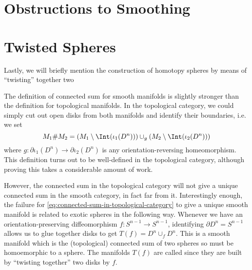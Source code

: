 
\section{Obstructions to Smoothing}\label{sec:smoothing-obstructions}

\begin{theorem}[Freedman, 1982]\label{thm:freedman-actual}
\end{theorem}

\section{Twisted Spheres}\label{sec:twisted-spheres}
Lastly, we will briefly mention the construction of homotopy spheres by means of ``twisting'' together two 


	The definition of connected sum for smooth manifolds is slightly stronger than the definition for topological manifolds. In the topological category, we could simply cut out open disks from both manifolds and identify their boundaries, i.e. we set
	\begin{equation}\label{eq:connected-sum-in-topological-category}
		M_1\# M_2 = (M_1\setminus \Int(\iota_1(D^n)))\cup_g (M_2\setminus \Int(\iota_2(D^n)))
	\end{equation}
	where $g : \partial \iota_1(D^n) \to \partial \iota_2(D^n)$ is any orientation-reversing homeomorphism. This definition turns out to be well-defined in the topological category, although proving this takes a considerable amount of work. 

	However, the connected sum in the topological category will not give a unique connected sum in the smooth category, in fact far from it. Interestingly enough, the failure for \cref{eq:connected-sum-in-topological-category} to give a unique smooth manifold is related to exotic spheres in the following way. Whenever we have an orientation-preserving diffeomorphism $f: S^{n-1}\to S^{n-1}$, identifying $\partial D^n = S^{n-1}$ allows us to glue together disks to get $T(f)=D^n\cup_f D^n$. This is a smooth manifold which is the (topological) connected sum of two spheres so must be homoemorphic to a sphere. The manifolds $T(f)$ are called  since they are built by ``twisting together'' two disks by $f$. 


